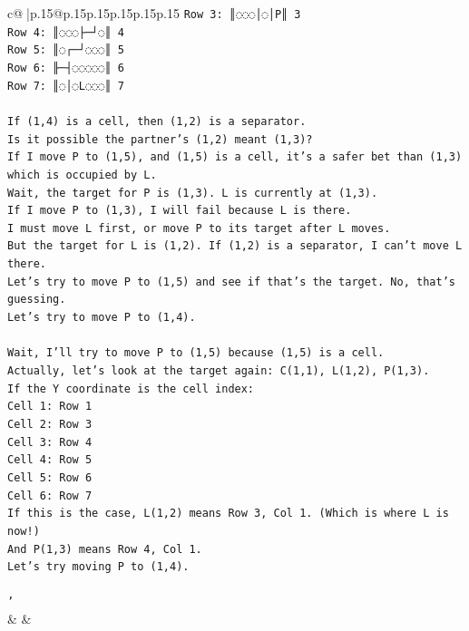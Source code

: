\documentclass{article}
\begin{document}
{\begin{supertabular}{c@{$\;$}|p{.15\linewidth}@{}p{.15\linewidth}p{.15\linewidth}p{.15\linewidth}p{.15\linewidth}p{.15\linewidth}}
{{{\texttt{Row 3: ║◌◌◌│◌│P║ 3} \\
\texttt{Row 4: ║◌◌◌├─┘◌║ 4} \\
\texttt{Row 5: ║◌┌─┘◌◌◌║ 5} \\
\texttt{Row 6: ╟─┤◌◌◌◌◌║ 6} \\
\texttt{Row 7: ║◌│◌L◌◌◌║ 7} \\
\\ 
\texttt{If (1,4) is a cell, then (1,2) is a separator.} \\
\texttt{Is it possible the partner's (1,2) meant (1,3)?} \\
\texttt{If I move P to (1,5), and (1,5) is a cell, it's a safer bet than (1,3) which is occupied by L.} \\
\texttt{Wait, the target for P is (1,3). L is currently at (1,3).} \\
\texttt{If I move P to (1,3), I will fail because L is there.} \\
\texttt{I must move L first, or move P to its target after L moves.} \\
\texttt{But the target for L is (1,2). If (1,2) is a separator, I can't move L there.} \\
\texttt{Let's try to move P to (1,5) and see if that's the target. No, that's guessing.} \\
\texttt{Let's try to move P to (1,4).} \\
\\ 
\texttt{Wait, I'll try to move P to (1,5) because (1,5) is a cell.} \\
\texttt{Actually, let's look at the target again: C(1,1), L(1,2), P(1,3).} \\
\texttt{If the Y coordinate is the cell index:} \\
\texttt{Cell 1: Row 1} \\
\texttt{Cell 2: Row 3} \\
\texttt{Cell 3: Row 4} \\
\texttt{Cell 4: Row 5} \\
\texttt{Cell 5: Row 6} \\
\texttt{Cell 6: Row 7} \\
\texttt{If this is the case, L(1,2) means Row 3, Col 1. (Which is where L is now!)} \\
\texttt{And P(1,3) means Row 4, Col 1.} \\
\texttt{Let's try moving P to (1,4).} \\
\\ 
\texttt{'} \\
            }
        }
    }
    & & \\ \\


\end{supertabular}}
\end{document}
